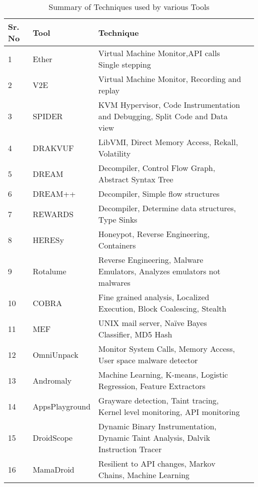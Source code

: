 \begin{table}[h]
		\begin{tabular}{l l l l }
			\hline
			Sr. No & Tool & Technique\\
			\hline
			1 & Ether & Virtual Machine Monitor,API calls Single stepping\\
			\hline
			2 & V2E & Virtual Machine Monitor, Recording and replay\\
			\hline
			3 & SPIDER & KVM Hypervisor, Code Instrumentation and Debugging, Split Code and Data view\\
			\hline
			4 & DRAKVUF & LibVMI, Direct Memory Access, Rekall, Volatility\\
			\hline
			5 & DREAM & Decompiler, Control Flow Graph, Abstract Syntax Tree\\
			\hline
			6 & DREAM++  & Decompiler, Simple flow structures\\
			\hline
			7 & REWARDS & Decompiler, Determine data structures, Type Sinks\\
			\hline
			8 & HERESy & Honeypot, Reverse Engineering, Containers\\
			\hline
			9 & Rotalume & Reverse Engineering, Malware Emulators, Analyzes emulators not malwares\\
			\hline
			10 & COBRA & Fine grained analysis, Localized Execution, Block Coalescing, Stealth\\
			\hline
			11 & MEF & UNIX mail server, Naïve Bayes Classifier, MD5 Hash\\
			\hline
			12 & OmniUnpack  & Monitor System Calls, Memory Access, User space malware detector\\
			\hline
			13 & Andromaly    & Machine Learning, K-means, Logistic Regression, Feature Extractors\\
			\hline
			14 & AppsPlayground   & Grayware detection, Taint tracing, Kernel level monitoring, API monitoring\\
			\hline
			15 & DroidScope  & Dynamic Binary Instrumentation, Dynamic Taint Analysis, Dalvik Instruction Tracer\\
			\hline
			16 & MamaDroid   & Resilient to API changes, Markov Chains, Machine Learning\\
			\hline
		\end{tabular}
	\caption{Summary of Techniques used by various Tools}
	\label{tab:summary}
	\end{table}